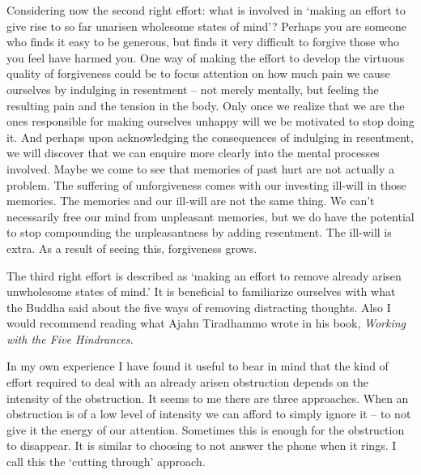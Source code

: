 Considering now the second right effort: what is involved in `making an
effort to give rise to so far unarisen wholesome states of mind'?
Perhaps you are someone who finds it easy to be generous, but finds it
very difficult to forgive those who you feel have harmed you. One way of
making the effort to develop the virtuous quality of forgiveness could
be to focus attention on how much pain we cause ourselves by indulging
in resentment -- not merely mentally, but feeling the resulting pain and
the tension in the body. Only once we realize that we are the ones
responsible for making ourselves unhappy will we be motivated to stop
doing it. And perhaps upon acknowledging the consequences of indulging
in resentment, we will discover that we can enquire more clearly into
the mental processes involved. Maybe we come to see that memories of
past hurt are not actually a problem. The suffering of unforgiveness
comes with our investing ill-will in those memories. The memories and
our ill-will are not the same thing. We can't necessarily free our mind
from unpleasant memories, but we do have the potential to stop
compounding the unpleasantness by adding resentment. The ill-will is
extra. As a result of seeing this, forgiveness grows.

The third right effort is described as `making an effort to remove
already arisen unwholesome states of mind.' It is beneficial to
familiarize ourselves with what the Buddha said about the five ways of
removing distracting thoughts\cite{thoughts}. Also I would recommend reading what
Ajahn Tiradhammo wrote in his book, \emph{Working with the Five Hindrances}\cite{hindrances}.

In my own experience I have found it useful to bear in mind that the
kind of effort required to deal with an already arisen obstruction
depends on the intensity of the obstruction. It seems to me there are
three approaches. When an obstruction is of a low level of intensity we
can afford to simply ignore it -- to not give it the energy of our
attention. Sometimes this is enough for the obstruction to disappear. It
is similar to choosing to not answer the phone when it rings. I call
this the `cutting through' approach.

